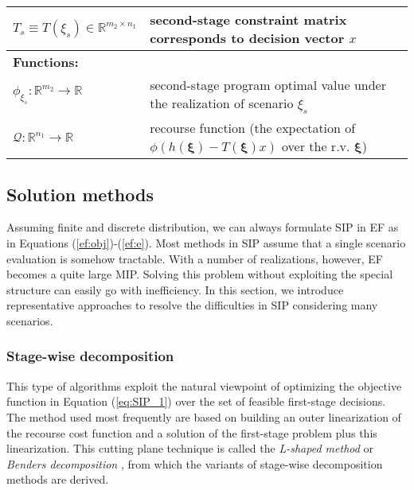 \begin{table}[]
{\begin{tabular}{ll}
			$T_s\equiv T(\xi_s)\in\mathbb{R}^{m_2\times n_1}$	& second-stage constraint matrix corresponds to decision vector $x$\\ \midrule
			\multicolumn{2}{l}{\textbf{Functions:}} \\
			$\phi_{\xi_s}:\mathbb{R}^{m_2}\to\mathbb{R}$	& second-stage program optimal value under the realization of scenario $\xi_s$	\\
			$\mathcal{Q}:\mathbb{R}^{n_1}\to\mathbb{R}$	& recourse function (the expectation of $\phi\left( h(\pmb{\xi})-T(\pmb{\xi})x \right)$ over the r.v. $\pmb{\xi}$) 	\\
			\bottomrule
		\end{tabular}
	}
\end{table} 

\subsection{Solution methods}
Assuming finite and discrete distribution, we can always formulate SIP in EF as in Equations (\ref{ef:obj})-(\ref{ef:e}).  %
Most methods in SIP assume that a single scenario evaluation is somehow tractable. With a number of realizations, however, EF becomes a quite large MIP. Solving this problem without exploiting the special structure can easily go with inefficiency. In this section, we introduce representative approaches to resolve the difficulties in SIP considering many scenarios.

\subsubsection{Stage-wise decomposition}
This type of algorithms exploit the natural viewpoint of optimizing the objective function in Equation (\ref{eq:SIP_1}) over the set of feasible first-stage decisions. The method used most frequently are based on building an outer linearization of the recourse cost function and a solution of the first-stage problem plus this linearization. This cutting plane technique is called the \textit{L-shaped method} or \textit{Benders decomposition} \cite{journal:B1962}, from which the variants of stage-wise decomposition methods are derived.

